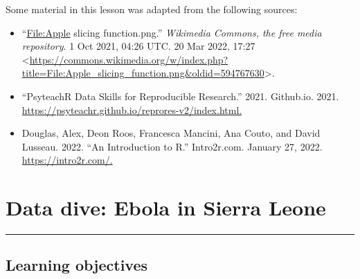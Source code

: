 \documentclass[
  letterpaper,
  DIV=11,
  numbers=noendperiod]{scrreprt}
\begin{document}
Some material in this lesson was adapted from the following sources:

\begin{itemize}
\item
  ``\url{File:Apple} slicing function.png.'' \emph{Wikimedia Commons,
  the free media repository}. 1 Oct 2021, 04:26 UTC. 20 Mar 2022, 17:27
  \textless{}\url{https://commons.wikimedia.org/w/index.php?title=File:Apple_slicing_function.png\&oldid=594767630}\textgreater.
\item
  ``PsyteachR \textbar{} Data Skills for Reproducible Research.'' 2021.
  Github.io. 2021.
  \url{https://psyteachr.github.io/reprores-v2/index.html.}
\item
  Douglas, Alex, Deon Roos, Francesca Mancini, Ana Couto, and David
  Lusseau. 2022. ``An Introduction to R.'' Intro2r.com. January 27,
  2022. \url{https://intro2r.com/.}
\end{itemize}


\hypertarget{data-dive-ebola-in-sierra-leone}{%
\chapter{Data dive: Ebola in Sierra
Leone}\label{data-dive-ebola-in-sierra-leone}}

\begin{center}\rule{0.5\linewidth}{0.5pt}\end{center}

\hypertarget{learning-objectives-2}{%
\section*{Learning objectives}\label{learning-objectives-2}}

\end{document}
